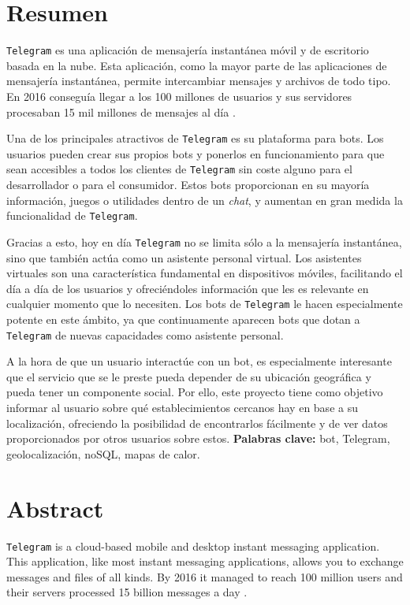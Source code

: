 \documentclass[oneside]{memoir}
\newcommand{\mychapter}[2]{
    \setcounter{chapter}{#1}
    \setcounter{section}{0}
    \chapter*{#2}
    \addcontentsline{toc}{chapter}{#2}
}
\begin{document}
\newpage
\mychapter{0}{Resumen}
\texttt{Telegram} es una aplicación de mensajería instantánea móvil y de escritorio basada en la nube. Esta aplicación, como la mayor parte de las aplicaciones de mensajería instantánea, permite intercambiar mensajes y archivos de todo tipo. En 2016 conseguía llegar a los 100 millones de usuarios y sus servidores procesaban 15 mil millones de mensajes al día \cite{stats}.

Una de los principales atractivos de \texttt{Telegram} es su plataforma para bots. Los usuarios pueden crear sus propios bots y ponerlos en funcionamiento para que sean accesibles a todos los clientes de \texttt{Telegram} sin coste alguno para el desarrollador o para el consumidor. Estos bots proporcionan en su mayoría información, juegos o utilidades dentro de un \textit{chat}, y aumentan en gran medida la funcionalidad de \texttt{Telegram}. 

Gracias a esto, hoy en día \texttt{Telegram} no se limita sólo a la mensajería instantánea, sino que también actúa como un asistente personal virtual. Los asistentes virtuales son una característica fundamental en dispositivos móviles, facilitando el día a día de los usuarios y ofreciéndoles información que les es relevante en cualquier momento que lo necesiten. Los bots de \texttt{Telegram} le hacen especialmente potente en este ámbito, ya que continuamente aparecen bots que dotan a \texttt{Telegram} de nuevas capacidades como asistente personal.

A la hora de que un usuario interactúe con un bot, es especialmente interesante que el servicio que se le preste pueda depender de su ubicación geográfica y pueda tener un componente social. Por ello, este proyecto tiene como objetivo informar al usuario sobre qué establecimientos cercanos hay en base a su localización, ofreciendo la posibilidad de encontrarlos fácilmente y de ver datos proporcionados por otros usuarios sobre estos.
\bigbreak
{\Large\textbf{Palabras clave:} bot, Telegram, geolocalización, noSQL, mapas de calor.}

\newpage
\mychapter{0}{Abstract}
\texttt{Telegram} is a cloud-based mobile and desktop instant messaging application. This application, like most instant messaging applications, allows you to exchange messages and files of all kinds. By 2016 it managed to reach 100 million users and their servers processed 15 billion messages a day \cite{stats}. %
\end{document}
